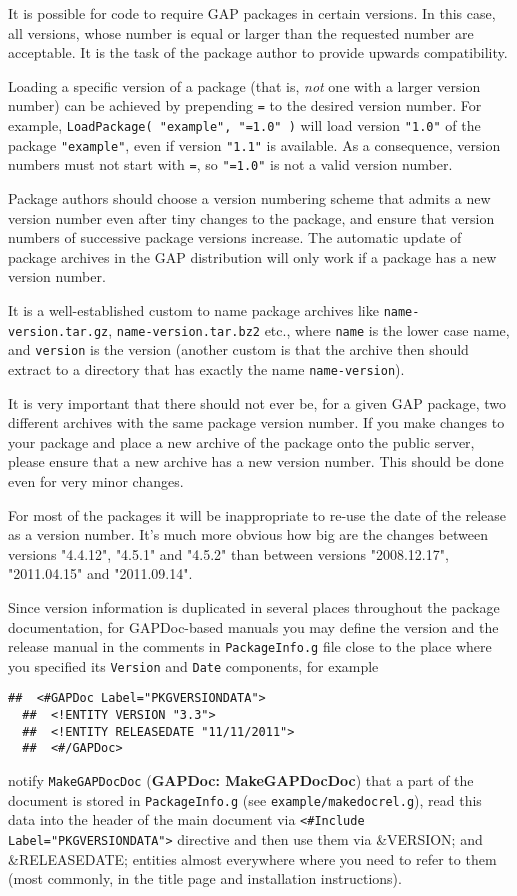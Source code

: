 \documentclass[a4paper,11pt]{report}
\begin{document}
{{ It is possible for code to require \textsf{GAP} packages in certain versions. In this case, all versions, whose number is
equal or larger than the requested number are acceptable. It is the task of
the package author to provide upwards compatibility. 

 Loading a specific version of a package (that is, \emph{not} one with a larger version number) can be achieved by prepending \texttt{=} to the desired version number. For example, \texttt{LoadPackage( "example", "=1.0" )} will load version \texttt{"1.0"} of the package \texttt{"example"}, even if version \texttt{"1.1"} is available. As a consequence, version numbers must not start with \texttt{=}, so \texttt{"=1.0"} is not a valid version number. 

 Package authors should choose a version numbering scheme that admits a new
version number even after tiny changes to the package, and ensure that version
numbers of successive package versions increase. The automatic update of
package archives in the \textsf{GAP} distribution will only work if a package has a new version number. 

 It is a well-established custom to name package archives like \texttt{name-version.tar.gz}, \texttt{name-version.tar.bz2} etc., where \texttt{name} is the lower case name, and \texttt{version} is the version (another custom is that the archive then should extract to a
directory that has exactly the name \texttt{name-version}). 

 It is very important that there should not ever be, for a given \textsf{GAP} package, two different archives with the same package version number. If you
make changes to your package and place a new archive of the package onto the
public server, please ensure that a new archive has a new version number. This
should be done even for very minor changes. 

 For most of the packages it will be inappropriate to re-use the date of the
release as a version number. It's much more obvious how big are the changes
between versions "4.4.12", "4.5.1" and "4.5.2" than between versions
"2008.12.17", "2011.04.15" and "2011.09.14". 

 Since version information is duplicated in several places throughout the
package documentation, for \textsf{GAPDoc}-based manuals you may define the version and the release manual in the
comments in \texttt{PackageInfo.g} file close to the place where you specified its \texttt{Version} and \texttt{Date} components, for example 
\begin{Verbatim}[commandchars=@|B,fontsize=\small,frame=single,label=Example]
  ##  <#GAPDoc Label="PKGVERSIONDATA">
  ##  <!ENTITY VERSION "3.3">
  ##  <!ENTITY RELEASEDATE "11/11/2011">
  ##  <#/GAPDoc>
\end{Verbatim}
 notify \texttt{MakeGAPDocDoc} (\textbf{GAPDoc: MakeGAPDocDoc}) that a part of the document is stored in \texttt{PackageInfo.g} (see \texttt{example/makedocrel.g}), read this data into the header of the main document via \texttt{{\textless}\#Include Label="PKGVERSIONDATA"{\textgreater}} directive and then use them via \&VERSION; and \&RELEASEDATE; entities almost
everywhere where you need to refer to them (most commonly, in the title page
and installation instructions). }

}
\end{document}
